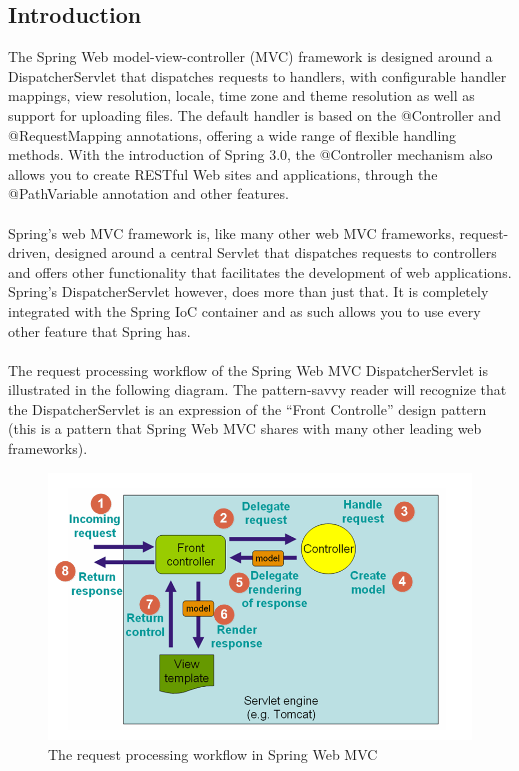 \documentclass[12pt]{article}
\begin{document}
\subsection{Introduction}
The Spring Web model-view-controller (MVC) framework is designed around a \colorbox{mygray}{DispatcherServlet} that dispatches requests to handlers, with configurable handler mappings, view resolution, locale, time zone and theme resolution as well as support for uploading files. The default handler is based on the \colorbox{mygray}{@Controller} and \colorbox{mygray}{@RequestMapping} annotations, offering a wide range of flexible handling methods. With the introduction of Spring 3.0, the \colorbox{mygray}{@Controller} mechanism also allows you to create RESTful Web sites and applications, through the \colorbox{mygray}{@PathVariable} annotation and other features.
 \\
\\
Spring’s web MVC framework is, like many other web MVC frameworks, request-driven, designed around a central Servlet that dispatches requests to controllers and offers other functionality that facilitates the development of web applications. Spring’s \colorbox{mygray}{DispatcherServlet} however, does more than just that. It is completely integrated with the Spring IoC container and as such allows you to use every other feature that Spring has.
\\
\\
The request processing workflow of the Spring Web MVC \colorbox{mygray}{DispatcherServlet} is illustrated in the following diagram. The pattern-savvy reader will recognize that the \colorbox{mygray}{DispatcherServlet} is an expression of the ``Front Controlle'' design pattern (this is a pattern that Spring Web MVC shares with many other leading web frameworks).
\begin{figure}[h]
	\centering
	\includegraphics[width=1.1\textwidth]{workflow_spring_mvc.png}
	\caption{The request processing workflow in Spring Web MVC}
\end{figure}
\vspace{66mm}
\end{document}
